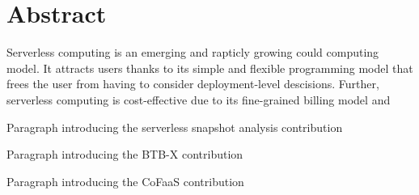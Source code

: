 \documentclass[../main.tex]{subfiles}
\begin{document}
\chapter{Abstract}


Serverless computing is an emerging and rapticly growing could computing model. It attracts users thanks to its simple and flexible programming model that frees the user from having to consider deployment-level descisions. Further, serverless computing is cost-effective due to its fine-grained billing model and 

Paragraph introducing the serverless snapshot analysis contribution

Paragraph introducing the BTB-X contribution


Paragraph introducing the CoFaaS contribution
\end{document}
